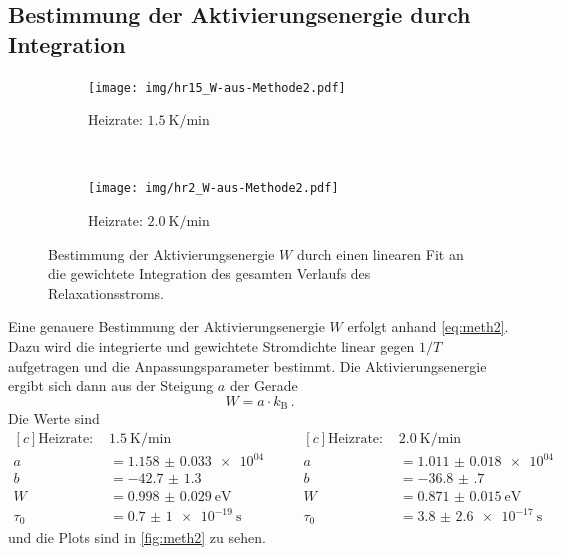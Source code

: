 \subsection{Bestimmung der Aktivierungsenergie durch Integration}
\label{sec:linin}

\begin{figure}[htp]
    \centering
    \begin{subfigure}[t]{0.5\textwidth}
        \centering
        \texttt{[image: img/hr15\_W-aus-Methode2.pdf]}
        \caption{Heizrate: $\SI{1.5}{\kelvin\per\minute}$}
    \end{subfigure}%
    ~
    \begin{subfigure}[t]{0.5\textwidth}
        \centering
        \texttt{[image: img/hr2\_W-aus-Methode2.pdf]}
        \caption{Heizrate: $\SI{2.0}{\kelvin\per\minute}$}
    \end{subfigure}
    \caption{Bestimmung der Aktivierungsenergie $W$ durch einen linearen Fit an die gewichtete Integration des gesamten Verlaufs des Relaxationsstroms.}
    \label{fig:meth2}
\end{figure}

Eine genauere Bestimmung der Aktivierungsenergie $W$ erfolgt anhand \autoref{eq:meth2}. Dazu wird die integrierte und gewichtete Stromdichte linear gegen $1/T$ aufgetragen und die Anpassungsparameter bestimmt. Die Aktivierungsenergie ergibt sich dann aus der Steigung $a$ der Gerade
\begin{equation*}
    W = a \cdot k_\text{B}\,.
\end{equation*}
Die Werte sind
\begin{equation*}
\begin{aligned}[c]
  \text{Heizrate: }& \SI{1.5}{\kelvin\per\minute}\\
  a &= \num{1.158(33)e+04}\\
  b &= \num{-42.7(13)}\\
  W &= \SI{0.998(29)}{\electronvolt}\\
  \tau_0 &= \SI{0.7(10)e-19}{\second}
\end{aligned}
\qquad
\begin{aligned}[c]
  \text{Heizrate: }& \SI{2.0}{\kelvin\per\minute}\\
  a &= \num{1.011(18)e+04}\\
  b &= \num{-36.8(7)}\\
  W &= \SI{0.871(15)}{\electronvolt}\\
  \tau_0 &= \SI{3.8(26)e-17}{\second}
\end{aligned}
\end{equation*}
und die Plots sind in \autoref{fig:meth2} zu sehen.

